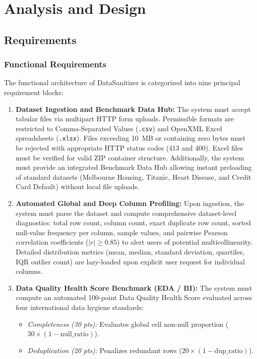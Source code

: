 \section{Analysis and Design}

\subsection{Requirements}

\subsubsection{Functional Requirements}
The functional architecture of DataSanitizer is categorized into nine principal requirement blocks:
\begin{enumerate}[label=\textbf{FR\arabic*.}]
  \item \textbf{Dataset Ingestion and Benchmark Data Hub:} The system must accept tabular files via multipart HTTP form uploads. Permissible formats are restricted to Comma-Separated Values (\texttt{.csv}) and OpenXML Excel spreadsheets (\texttt{.xlsx}). Files exceeding 10~MB or containing zero bytes must be rejected with appropriate HTTP status codes (413 and 400). Excel files must be verified for valid ZIP container structure. Additionally, the system must provide an integrated Benchmark Data Hub allowing instant preloading of standard datasets (Melbourne Housing, Titanic, Heart Disease, and Credit Card Default) without local file uploads.
  \item \textbf{Automated Global and Deep Column Profiling:} Upon ingestion, the system must parse the dataset and compute comprehensive dataset-level diagnostics: total row count, column count, exact duplicate row count, sorted null-value frequency per column, sample values, and pairwise Pearson correlation coefficients ($|r| \ge 0.85$) to alert users of potential multicollinearity. Detailed distribution metrics (mean, median, standard deviation, quartiles, IQR outlier count) are lazy-loaded upon explicit user request for individual columns.
  \item \textbf{Data Quality Health Score Benchmark (EDA / BI):} The system must compute an automated 100-point Data Quality Health Score evaluated across four international data hygiene standards:
  \begin{itemize}
    \item \emph{Completeness (30 pts):} Evaluates global cell non-null proportion ($30 \times (1 - \text{null\_ratio})$).
    \item \emph{Deduplication (20 pts):} Penalizes redundant rows ($20 \times (1 - \text{dup\_ratio})$).

\end{itemize}
\end{enumerate}
